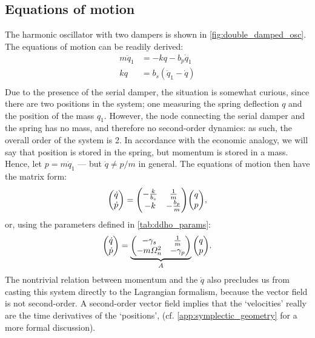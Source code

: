\subsection{Equations of motion}
The harmonic oscillator with two dampers is shown in \cref{fig:double_damped_osc}. The equations of motion can be readily derived:
\begin{equation}
    \begin{split}
        m\ddot{q}_1 &= -kq - b_p \dot{q}_1 \\
        kq &= b_s(\dot{q}_1 - \dot{q}) \\
    \end{split}
\end{equation}
Due to the presence of the serial damper, the situation is somewhat curious, since there are two positions in the system; one measuring the spring deflection $q$ and the position of the mass $q_1$. However, the node connecting the serial damper and the spring has no mass, and therefore no second-order dynamics: as such, the overall order of the system is 2. In accordance with the economic analogy, we will say that position is stored in the spring, but momentum is stored in a mass. Hence, let $p = m\dot{q}_1$ --- but $\dot{q} \neq p/m$ in general. The equations of motion then have the matrix form:
\begin{equation*}
    \mqty(\dot{q}\\\dot{p}) = \mqty(-\tfrac{k}{b_s} & \tfrac{1}{m} \\ -k & - \tfrac{b_p}{m})\mqty(q \\ p),
\end{equation*}
or, using the parameters defined in \cref{tab:ddho_params}:
\begin{equation}
    \mqty(\dot{q}\\\dot{p}) = \underbrace{\mqty(-\gamma_s & \frac{1}{m} \\ -m\Omega_n^2 & - \gamma_p)}_A \mqty(q \\ p).
    \label{eq:ddho_eom}
\end{equation}
The nontrivial relation between momentum and the $\dot{q}$ also precludes us from casting this system directly to the Lagrangian formalism, because the vector field is not second-order. A second-order vector field implies that the `velocities' really are the time derivatives of the `positions', (cf. \cref{app:symplectic_geometry} for a more formal discussion).

